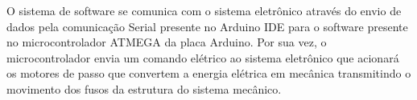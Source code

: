 O sistema de software se comunica com o sistema eletrônico através do envio de dados pela comunicação 
Serial presente no Arduino IDE para o software presente no microcontrolador ATMEGA da placa Arduino. 
Por sua vez, o microcontrolador envia um comando elétrico ao sistema eletrônico que acionará os motores 
de passo que convertem a energia elétrica em mecânica transmitindo o movimento dos fusos da estrutura do 
sistema mecânico.